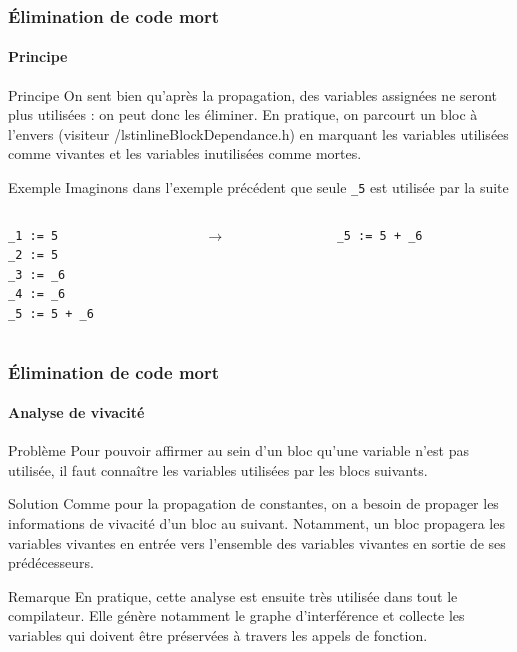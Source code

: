 \documentclass{beamer}
\begin{document}
\begin{frame}[fragile]
    \frametitle{Élimination de code mort}
    \framesubtitle{Principe}
    
    \begin{block}{Principe}
        On sent bien qu'après la propagation, des variables assignées ne seront plus
        utilisées : on peut donc les éliminer. En pratique, on parcourt un bloc
        à l'envers (visiteur /lstinline{BlockDependance.h}) en marquant les variables 
        utilisées comme vivantes et les variables inutilisées comme mortes.

    \end{block}
    \pause
    \begin{exampleblock}{Exemple}
        Imaginons dans l'exemple précédent que seule \lstinline{_5} est utilisée par la suite
         \begin{columns}
            \begin{column}{.40\textwidth}
                    \begin{lstlisting}
_1 := 5
_2 := 5
_3 := _6
_4 := _6
_5 := 5 + _6
                    \end{lstlisting}
            \end{column}
            \pause
            \begin{column}{.04\textwidth}
                $\rightarrow$
            \end{column}
            \begin{column}{.40\textwidth}
                    \begin{lstlisting}
_5 := 5 + _6

                    \end{lstlisting}
            \end{column}
        \end{columns}       
    \end{exampleblock}
\end{frame}

\begin{frame}
    \frametitle{Élimination de code mort}
    \framesubtitle{Analyse de vivacité}
    \begin{alertblock}{Problème}
        Pour pouvoir affirmer au sein d'un bloc qu'une variable n'est pas utilisée,
        il faut connaître les variables utilisées par les blocs suivants. 
    \end{alertblock}
    \pause
    \begin{block}{Solution}
        Comme pour la propagation de constantes, on a besoin de propager les informations
        de vivacité d'un bloc au suivant. Notamment, un bloc propagera les variables
        vivantes en entrée vers l'ensemble des variables vivantes en sortie de ses
        prédécesseurs.
    \end{block}
    \pause
    \begin{block}{Remarque}
        En pratique, cette analyse est ensuite très utilisée dans tout le compilateur.
        Elle génère notamment le graphe d'interférence et collecte les variables qui doivent
        être préservées à travers les appels de fonction.
    \end{block}
\end{frame}
\end{document}

